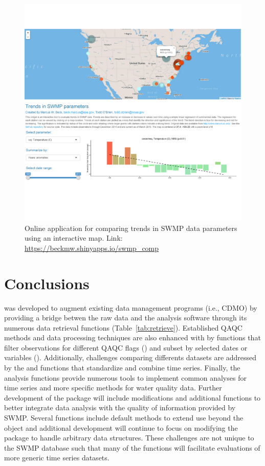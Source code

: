 \begin{figure}
\begin{center}
\includegraphics[width = \textwidth]{swmp_comp.pdf}
\caption{Online application for comparing trends in SWMP data parameters using an interactive map.  Link: \href{https://beckmw.shinyapps.io/swmp_comp}{https://beckmw.shinyapps.io/swmp\_comp}}
\label{fig:swmp_comp}
\end{center}
\end{figure}

\section{Conclusions}

 was developed to augment existing data management programs (i.e., CDMO) by providing a bridge betwen the raw data and the analysis software through its numerous data retrieval functions (Table~\ref{tab:retrieve}).  Established QAQC methods and data processing techniques are also enhanced with  by functions that filter observations for different QAQC flags () and subset by selected dates or variables ().  Additionally, challenges comparing differents datasets are addressed by the  and  functions that standardize and combine time series.  Finally, the analysis functions provide numerous tools to implement common analyses for time series and more specific methods for water quality data.  Further development of the package will include modifications and additional functions to better integrate data analysis with the quality of information provided by SWMP.  Several functions include default methods to extend use beyond the  object and additional development will continue to focus on modifying the package to handle arbitrary data structures.  These challenges are not unique to the SWMP database such that many of the functions will facilitate evaluations of more generic time series datasets.  

